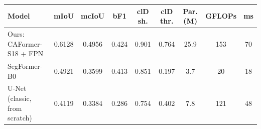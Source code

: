 \begin{tabular}{lcccccccc}
\hline
Model & mIoU & mcIoU & bF1 & clD sh. & clD thr. & Par. (M) & GFLOPs & ms \\
\hline
Ours: CAFormer-S18 + FPN & 0.6128 & 0.4956 & 0.424 & 0.901 & 0.764 & 25.9 & 153 & 70 \\
SegFormer-B0 & 0.4921 & 0.3599 & 0.413 & 0.851 & 0.197 & 3.7 & 20 & 18 \\
U-Net (classic, from scratch) & 0.4119 & 0.3384 & 0.286 & 0.754 & 0.402 & 7.8 & 121 & 48 \\
\hline
\end{tabular}
